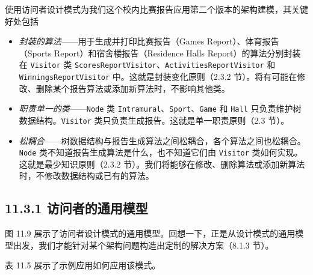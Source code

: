 使用访问者设计模式为我们这个校内比赛报告应用第二个版本的架构建模，其关键好处包括

\begin{itemize}
\item \emph{封装的算法}——用于生成并打印比赛报告（Games Report）、体育报告（Sports Report）和宿舍楼报告（Residence Halls Report）的算法分别封装在 \texttt{Visitor} 类 \texttt{Scores\allowbreak{}Report\allowbreak{}Visitor}、\texttt{Activities\allowbreak{}Report\allowbreak{}Visitor} 和 \texttt{Winnings\allowbreak{}Report\allowbreak{}Visitor} 中。这就是封装变化原则（2.3.2 节）。将有可能在修改、删除某个报告算法或添加新算法时，不影响其他类。
\item \emph{职责单一的类}——\texttt{Node} 类 \texttt{Intramural}、\texttt{Sport}、\texttt{Game} 和 \texttt{Hall} 只负责维护树数据结构。\texttt{Visitor} 类只负责生成报告。这就是单一职责原则（2.3 节）。
\item \emph{松耦合}——树数据结构与报告生成算法之间松耦合，各个算法之间也松耦合。\texttt{Node} 类不知道报告生成算法是什么，也不知道它们由 \texttt{Visitor} 类如何实现。这就是最少知识原则（2.3.2 节）。我们将能够在修改、删除算法或添加新算法时，不修改数据结构或已有的算法。
\end{itemize}

\subsection{11.3.1 访问者的通用模型}

图 11.9 展示了访问者设计模式的通用模型。回想一下，正是从设计模式的通用模型出发，我们才能针对某个架构问题构造出定制的解决方案（8.1.3 节）。


表 11.5 展示了示例应用如何应用该模式。

